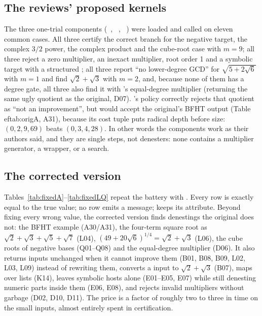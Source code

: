 \subsection{The reviews' proposed kernels}
\label{sec:expkernels}
The three one-trial components (\RI\ ,
\RII\ , \RIII\ ) were
loaded and called on eleven common cases. All three certify the correct
branch for the negative target, the complex $3/2$ power, the complex product
and the cube-root case with $m=9$; all three reject a zero multiplier, an
inexact multiplier, root order 1 and a symbolic target with a structured
; all three report ``no lower-degree GCD'' for
$\sqrt{5+2\sqrt6}$ with $m=1$ and find $\sqrt2+\sqrt3$ with $m=2$, and, because
none of them has a degree gate, all three also find it with \RII's
equal-degree multiplier (returning the same ugly quotient as the original,
D07). \RIII's  policy correctly rejects that quotient
as ``not an improvement'', but would accept the original's BFHT output
(Table~
ef{tab:origA}, A31), because its cost tuple puts radical depth before
size: $(0,2,9,69)$ beats $(0,3,4,28)$. In other words the components work as
their authors said, and they are single steps, not denesters: none contains a
multiplier generator, a wrapper, or a search.

\subsection{The corrected version}
\label{sec:expfixed}
Tables~\ref{tab:fixedA}--\ref{tab:fixedLQ} repeat the battery with
. Every row is exactly equal to the true value; no row
emits a message;  keeps its  attribute. Beyond
fixing every wrong value, the corrected version finds denestings the original
does not: the BFHT example (A30/A31), the four-term square root as
$\sqrt2+\sqrt3+\sqrt5+\sqrt7$ (L04), $(49+20\sqrt6)^{1/4}=\sqrt2+\sqrt3$ (L06),
the cube roots of negative bases (Q01--Q08) and the equal-degree multiplier
(D06). It also returns inputs unchanged when it cannot improve them (B01, B08,
B09, L02, L03, L09) instead of rewriting them, converts a  input to
$\sqrt2+\sqrt3$ (B07), maps over lists (K14), leaves symbolic hosts alone
(E01--E05, E07) while still denesting numeric parts inside them (E06, E08), and
rejects invalid multipliers without garbage (D02, D10, D11). The price is a
factor of roughly two to three in time on the small inputs, almost entirely
spent in  certification.






